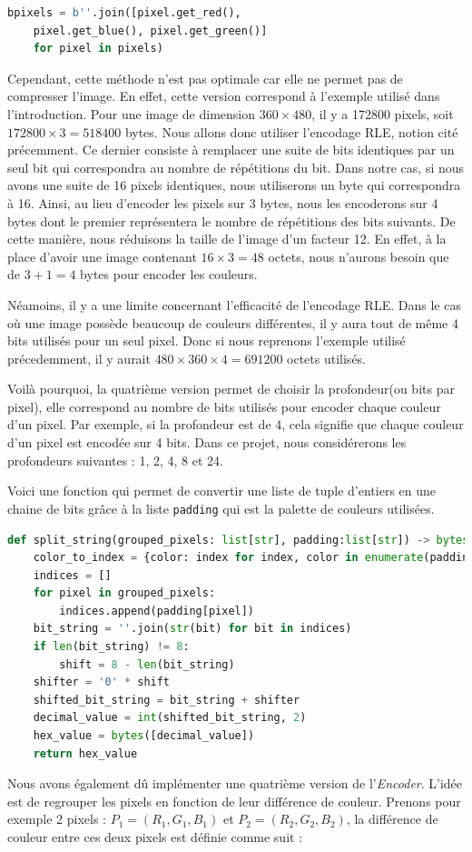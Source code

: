 \documentclass[utf8]{article}
\begin{document}
\begin{lstlisting}[language=Python, basicstyle=\small]
bpixels = b''.join([pixel.get_red(), 
	pixel.get_blue(), pixel.get_green()] 
	for pixel in pixels)
\end{lstlisting}

Cependant, cette méthode n'est pas optimale car elle ne permet pas de compresser l'image. En effet, cette version correspond à l'exemple utilisé dans l'introduction. Pour une image de dimension $360 \times 480$, il y a 172800 pixels, soit $172800 \times 3 = 518400$ bytes. Nous allons donc utiliser l'encodage RLE, notion cité précemment. Ce dernier consiste à remplacer une suite de bits identiques par un seul bit qui correspondra au nombre de répétitions du bit. Dans notre cas, si nous avons une suite de 16 pixels identiques, nous utiliserons un byte qui correspondra à 16. Ainsi, au lieu d'encoder les pixels sur 3 bytes, nous les encoderons sur 4 bytes dont le premier représentera le nombre de répétitions des bits suivants. De cette manière, nous réduisons la taille de l'image d'un facteur 12. En effet, à la place d'avoir une image contenant $16 \times 3 = 48$ octets, nous n'aurons besoin que de $3+1 = 4$ bytes pour encoder les couleurs.

Néamoins, il y a une limite concernant l'efficacité de l'encodage RLE. Dans le cas où une image possède beaucoup de couleurs différentes, il y aura tout de même 4 bits utilisés pour un seul pixel. Donc si nous reprenons l'exemple utilisé précedemment, il y aurait $480 \times 360 \times 4 = 691200$ octets utilisés.

Voilà pourquoi, la quatrième version permet de choisir la profondeur(ou bits par pixel), elle correspond au nombre de bits utilisés pour encoder chaque couleur d'un pixel. Par exemple, si la profondeur est de 4, cela signifie que chaque couleur d'un pixel est encodée sur 4 bits. Dans ce projet, nous considérerons les profondeurs suivantes : 1, 2, 4, 8 et 24. 

Voici une fonction qui permet de convertir une liste de tuple d'entiers en une chaine de bits grâce à la liste \texttt{padding} qui est la palette de couleurs utilisées.
\begin{lstlisting}[language=Python, basicstyle=\small]
def split_string(grouped_pixels: list[str], padding:list[str]) -> bytes:
	color_to_index = {color: index for index, color in enumerate(padding)}
	indices = []
	for pixel in grouped_pixels:   	
		indices.append(padding[pixel])
	bit_string = ''.join(str(bit) for bit in indices)
	if len(bit_string) != 8:  
		shift = 8 - len(bit_string)
	shifter = '0' * shift
	shifted_bit_string = bit_string + shifter
	decimal_value = int(shifted_bit_string, 2)
	hex_value = bytes([decimal_value])
	return hex_value
\end{lstlisting}
Nous avons également dû implémenter une quatrième  version de l'\textit{Encoder}. L'idée est de regrouper les pixels en fonction de leur différence de couleur. Prenons pour exemple 2 pixels : $P_1 = (R_1, G_1, B_1)$ et $P_2 = (R_2, G_2, B_2)$, la différence de couleur entre ces deux pixels est définie comme suit : 
\end{document}
